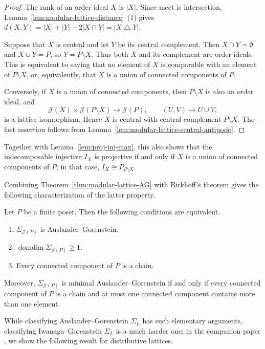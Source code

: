 \documentclass[a4paper,leqno]{amsart}
\begin{document}
\begin{proof}
The rank of an order ideal $X$ is $|X|$. Since meet is intersection,
Lemma~\ref{lem:modular-lattice-distance}~(1) gives
$d(X,Y)=|X|+|Y|-2|X\cap Y|=|X\mathbin{\triangle}Y|$.

Suppose that $X$ is central and let $Y$ be its central complement. Then
$X\cap Y=\emptyset$ and $X\cup Y=P$, so $Y=P\setminus X$. Thus both
$X$ and its complement are order ideals. This is equivalent to saying
that no element of $X$ is comparable with an element of $P\setminus X$,
or, equivalently, that $X$ is a union of connected components of $P$.

Conversely, if $X$ is a union of connected components, then
$P\setminus X$ is also an order ideal, and
\[
\mathcal J(X)\times\mathcal J(P\setminus X)
\longrightarrow\mathcal J(P),
\qquad (U,V)\longmapsto U\cup V,
\]
is a lattice isomorphism. Hence $X$ is central with central complement
$P\setminus X$. The last assertion follows from
Lemma~\ref{lem:modular-lattice-central-antipode}.
\end{proof}

Together with Lemma~\ref{lem:proj-inj-max}, this also shows that the
indecomposable injective $I_X$ is projective if and only if $X$ is a
union of connected components of $P$; in that case,
$I_X\cong P_{P\setminus X}$.

Combining Theorem~\ref{thm:modular-lattice-AG} with Birkhoff's theorem gives the following characterization of the latter property.

\begin{cor}\label{cor:distributive-lattice-AG}
Let $P$ be a finite poset. Then the following conditions are equivalent.
\begin{enumerate}
    \item $\Sigma_{\mathcal{J}(P)}$ is Auslander--Gorenstein.
    \item $\operatorname{domdim}\Sigma_{\mathcal{J}(P)}\geq1$.
    \item Every connected component of $P$ is a chain.
\end{enumerate}
Moreover, $\Sigma_{\mathcal J(P)}$ is minimal Auslander--Gorenstein if and only if every connected component of $P$ is a chain and at most one connected component contains more than one element.
\end{cor}

While classifying Auslander--Gorenstein $\Sigma_L$ has such elementary arguments, classifying Iwanaga--Gorenstein $\Sigma_L$ is a much harder one; in the companion paper \cite[Theorem~A]{CX2026}, we show the following result for distributive lattices.
\end{document}
